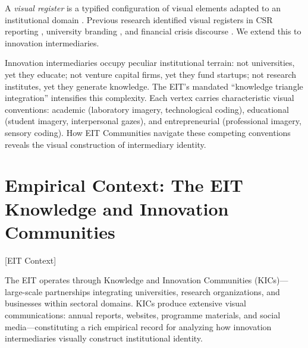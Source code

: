 \documentclass[../main.tex]{subfiles}
\begin{document}
A \textit{visual register} is a typified configuration of visual elements adapted to an institutional domain \cite{jancsary2018institutions}. Previous research identified visual registers in CSR reporting \cite{hollerer2013imageries}, university branding \cite{drori2016iconography}, and financial crisis discourse \cite{hollerer2017picture}. We extend this to innovation intermediaries.

Innovation intermediaries occupy peculiar institutional terrain: not universities, yet they educate; not venture capital firms, yet they fund startups; not research institutes, yet they generate knowledge. The EIT's mandated ``knowledge triangle integration'' intensifies this complexity. Each vertex carries characteristic visual conventions: academic (laboratory imagery, technological coding), educational (student imagery, interpersonal gazes), and entrepreneurial (professional imagery, sensory coding). How EIT Communities navigate these competing conventions reveals the visual construction of intermediary identity.

\section{Empirical Context: The EIT Knowledge and Innovation Communities}[EIT Context]

The EIT operates through Knowledge and Innovation Communities (KICs)---large-scale partnerships integrating universities, research organizations, and businesses within sectoral domains. KICs produce extensive visual communications: annual reports, websites, programme materials, and social media---constituting a rich empirical record for analyzing how innovation intermediaries visually construct institutional identity.

\end{document}
